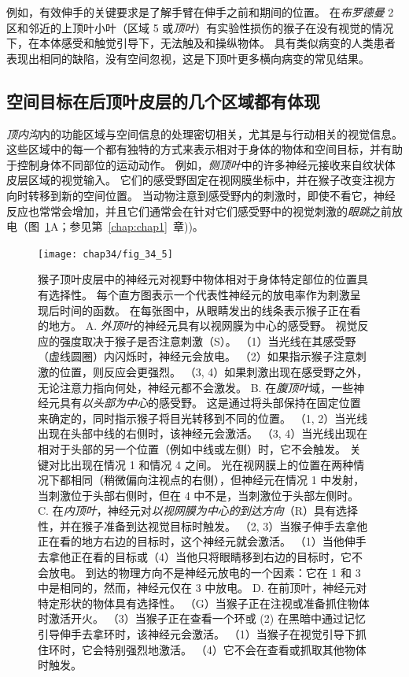 例如，有效伸手的关键要求是了解手臂在伸手之前和期间的位置。
在\textit{布罗德曼} 2 区和邻近的上顶叶小叶（区域 5 或\textit{顶叶}）有实验性损伤的猴子在没有视觉的情况下，在本体感受和触觉引导下，无法触及和操纵物体。
具有类似病变的人类患者表现出相同的缺陷，没有空间忽视，这是下顶叶更多横向病变的常见结果。



\subsection{空间目标在后顶叶皮层的几个区域都有体现}

\textit{顶内沟}内的功能区域与空间信息的处理密切相关，尤其是与行动相关的视觉信息。
这些区域中的每一个都有独特的方式来表示相对于身体的物体和空间目标，并有助于控制身体不同部位的运动动作。
例如，\textit{侧顶叶}中的许多神经元接收来自纹状体皮层区域的视觉输入。
它们的感受野固定在视网膜坐标中，并在猴子改变注视方向时转移到新的空间位置。
当动物注意到感受野内的刺激时，即使不看它，神经反应也常常会增加，并且它们通常会在针对它们感受野中的视觉刺激的\textit{眼跳}之前放电（图~\ref{fig:34_5}A；参见第~\ref{chap:chap1}~章))。


\begin{figure}[htbp]
	\centering
	\texttt{[image: chap34/fig\_34\_5]}
	\caption{猴子顶叶皮层中的神经元对视野中物体相对于身体特定部位的位置具有选择性。
		每个直方图表示一个代表性神经元的放电率作为刺激呈现后时间的函数。
		在每张图中，从眼睛发出的线条表示猴子正在看的地方。
		A. \textit{外顶叶}的神经元具有以视网膜为中心的感受野。
		视觉反应的强度取决于猴子是否注意刺激（S）。
		（1）当光线在其感受野（虚线圆圈）内闪烁时，神经元会放电。
		（2）如果指示猴子注意刺激的位置，则反应会更强烈。 
		（3, 4）如果刺激出现在感受野之外，无论注意力指向何处，神经元都不会激发。
		B. 在\textit{腹顶叶}域，一些神经元具有\textit{以头部为中心}的感受野。
		这是通过将头部保持在固定位置来确定的，同时指示猴子将目光转移到不同的位置。
		（1, 2）当光线出现在头部中线的右侧时，该神经元会激活。
		（3, 4）当光线出现在相对于头部的另一个位置（例如中线或左侧）时，它不会触发。
		 关键对比出现在情况 1 和情况 4 之间。
		 光在视网膜上的位置在两种情况下都相同（稍微偏向注视点的右侧），但神经元在情况 1 中发射，当刺激位于头部右侧时，但在 4 中不是，当刺激位于头部左侧时。 
		 C. 在\textit{内顶叶}，神经元对\textit{以视网膜为中心的到达方向}（R）具有选择性，并在猴子准备到达视觉目标时触发。
		 （2, 3）当猴子伸手去拿他正在看的地方右边的目标时，这个神经元就会激活。
		 （1）当他伸手去拿他正在看的目标或（4）当他只将眼睛移到右边的目标时，它不会放电。
		 到达的物理方向不是神经元放电的一个因素：它在 1 和 3 中是相同的，然而，神经元仅在 3 中放电。
		 D. 在前顶叶，神经元对特定形状的物体具有选择性。
		 （G）当猴子正在注视或准备抓住物体时激活开火。
		 （3）当猴子正在查看一个环或 (2) 在黑暗中通过记忆引导伸手去拿环时，该神经元会激活。
		 （1）当猴子在视觉引导下抓住环时，它会特别强烈地激活。
		 （4）它不会在查看或抓取其他物体时触发。}
	\label{fig:34_5}
\end{figure}


